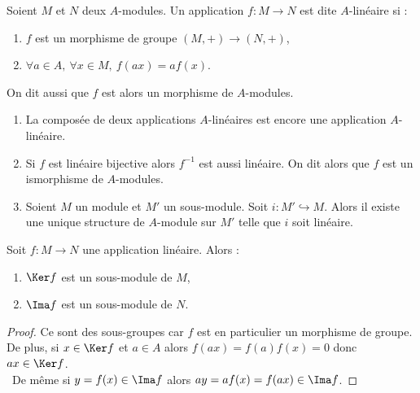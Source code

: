 \begin{defi}

Soient $M$ et $N$ deux $A$-modules. Un application $f : M \rightarrow N$ est
dite $A$-linéaire si :
\begin{enumerate}
 \item $f$ est un morphisme de groupe $(M,+)\rightarrow(N,+)$,
 \item $\forall a \in A,\ \forall x \in M,\ f(ax) = af(x)$.
\end{enumerate}

On dit aussi que $f$ est alors un morphisme de $A$-modules.
\end{defi}

\begin{example}[Remarque]
 \begin{enumerate}
  \item La composée de deux applications $A$-linéaires est encore une
application $A$-linéaire.
\item Si $f$ est linéaire bijective alors $f^{-1}$ est aussi linéaire. On dit
alors que $f$ est un ismorphisme de $A$-modules.
\item Soient $M$ un module et $M'$ un sous-module. Soit $i : M'\hookrightarrow
M$. Alors il existe une unique structure de $A$-module sur $M'$ telle que $i$
soit linéaire.
 \end{enumerate}
\end{example}

\begin{prop}
 
 Soit $f : M \rightarrow N$ une application linéaire. Alors :
 \begin{enumerate}
  \item $\Ker f$ est un sous-module de $M$,
  \item $\Ima f$ est un sous-module de $N$.
 \end{enumerate}
\end{prop}

\begin{proof}
 Ce sont des sous-groupes car $f$ est en particulier un morphisme de groupe.\\
 De plus, si $x\in \Ker f$ et $a\in A$ alors $f(ax)=f(a)f(x)=0$ donc $ax\in
\Ker f$.\\ De même si $y=f(x) \in\Ima f$ alors $ay = af(x) = f(ax)\in\Ima f$.
\end{proof}

